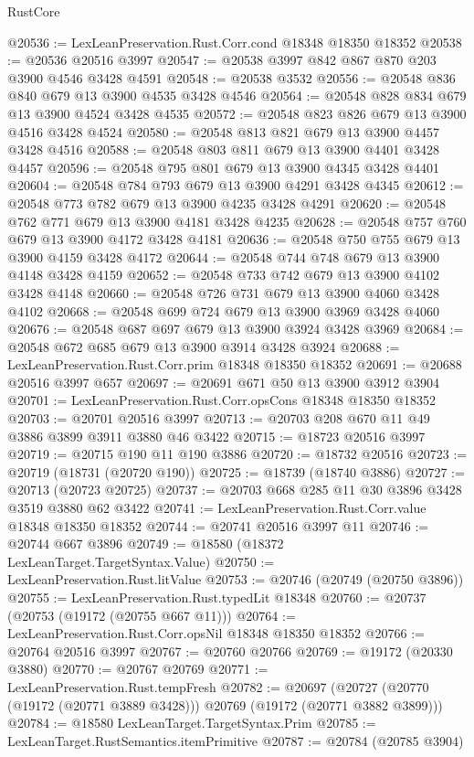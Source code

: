 \begin{lexlean}{RustCore}
\begin{coremodule}
@20536 := LexLeanPreservation.Rust.Corr.cond @18348 @18350 @18352
@20538 := @20536 @20516 @3997
@20547 := @20538 @3997 @842 @867 @870 @203 @3900 @4546 @3428 @4591
@20548 := @20538 @3532
@20556 := @20548 @836 @840 @679 @13 @3900 @4535 @3428 @4546
@20564 := @20548 @828 @834 @679 @13 @3900 @4524 @3428 @4535
@20572 := @20548 @823 @826 @679 @13 @3900 @4516 @3428 @4524
@20580 := @20548 @813 @821 @679 @13 @3900 @4457 @3428 @4516
@20588 := @20548 @803 @811 @679 @13 @3900 @4401 @3428 @4457
@20596 := @20548 @795 @801 @679 @13 @3900 @4345 @3428 @4401
@20604 := @20548 @784 @793 @679 @13 @3900 @4291 @3428 @4345
@20612 := @20548 @773 @782 @679 @13 @3900 @4235 @3428 @4291
@20620 := @20548 @762 @771 @679 @13 @3900 @4181 @3428 @4235
@20628 := @20548 @757 @760 @679 @13 @3900 @4172 @3428 @4181
@20636 := @20548 @750 @755 @679 @13 @3900 @4159 @3428 @4172
@20644 := @20548 @744 @748 @679 @13 @3900 @4148 @3428 @4159
@20652 := @20548 @733 @742 @679 @13 @3900 @4102 @3428 @4148
@20660 := @20548 @726 @731 @679 @13 @3900 @4060 @3428 @4102
@20668 := @20548 @699 @724 @679 @13 @3900 @3969 @3428 @4060
@20676 := @20548 @687 @697 @679 @13 @3900 @3924 @3428 @3969
@20684 := @20548 @672 @685 @679 @13 @3900 @3914 @3428 @3924
@20688 := LexLeanPreservation.Rust.Corr.prim @18348 @18350 @18352
@20691 := @20688 @20516 @3997 @657
@20697 := @20691 @671 @50 @13 @3900 @3912 @3904
@20701 := LexLeanPreservation.Rust.Corr.opsCons @18348 @18350 @18352
@20703 := @20701 @20516 @3997
@20713 := @20703 @208 @670 @11 @49 @3886 @3899 @3911 @3880 @46 @3422
@20715 := @18723 @20516 @3997
@20719 := @20715 @190 @11 @190 @3886
@20720 := @18732 @20516
@20723 := @20719 (@18731 (@20720 @190))
@20725 := @18739 (@18740 @3886)
@20727 := @20713 (@20723 @20725)
@20737 := @20703 @668 @285 @11 @30 @3896 @3428 @3519 @3880 @62 @3422
@20741 := LexLeanPreservation.Rust.Corr.value @18348 @18350 @18352
@20744 := @20741 @20516 @3997 @11
@20746 := @20744 @667 @3896
@20749 := @18580 (@18372 LexLeanTarget.TargetSyntax.Value)
@20750 := LexLeanPreservation.Rust.litValue
@20753 := @20746 (@20749 (@20750 @3896))
@20755 := LexLeanPreservation.Rust.typedLit @18348
@20760 := @20737 (@20753 (@19172 (@20755 @667 @11)))
@20764 := LexLeanPreservation.Rust.Corr.opsNil @18348 @18350 @18352
@20766 := @20764 @20516 @3997
@20767 := @20760 @20766
@20769 := @19172 (@20330 @3880)
@20770 := @20767 @20769
@20771 := LexLeanPreservation.Rust.tempFresh
@20782 := @20697
    (@20727 (@20770 (@19172 (@20771 @3889 @3428))) @20769 (@19172 (@20771 @3882 @3899)))
@20784 := @18580 LexLeanTarget.TargetSyntax.Prim
@20785 := LexLeanTarget.RustSemantics.itemPrimitive
@20787 := @20784 (@20785 @3904)

\end{coremodule}
\end{lexlean}

